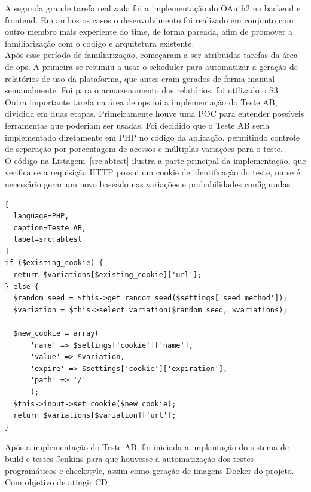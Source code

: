 A segunda grande tarefa realizada foi a implementação do \gls{OAuth2} no \gls{backend} e \gls{frontend}. Em ambos os casos o desenvolvimento foi realizado em conjunto com outro membro mais experiente do time, de forma pareada, afim de promover a familiarização com o código e arquitetura existente.\\

Após esse período de familiarização, começaram a ser atribuídas tarefas da área de \gls{ops}. A primeira se resumiu a usar o \gls{scheduler} para automatizar a geração de relatórios de uso da plataforma, que antes eram gerados de forma manual semanalmente. Foi para o armazenamento dos relatórios, foi utilizado o \gls{S3}.\\

Outra importante tarefa na área de \gls{ops} foi a implementação do \gls{Teste AB}, dividida em duas etapas. Primeiramente houve uma \gls{POC} para entender possíveis ferramentas que poderiam ser usadas. Foi decidido que o \gls{Teste AB} seria implementado diretamente em \gls{PHP} no código da aplicação, permitindo controle de separação por porcentagem de acessos e múltiplas variações para o teste.\\

O código na Listagem~\ref{src:abtest} ilustra a parte principal da implementação, que verifica se a requisição \gls{HTTP} possui um \gls{cookie} de identificação do teste, ou se é necessário gerar um novo baseado nas variações e probabilidades configuradas\\

\begin{lstlisting}[
  language=PHP,
  caption=Teste AB,
  label=src:abtest
]
if ($existing_cookie) {
  return $variations[$existing_cookie]['url'];
} else {
  $random_seed = $this->get_random_seed($settings['seed_method']);
  $variation = $this->select_variation($random_seed, $variations);

  $new_cookie = array(
      'name' => $settings['cookie']['name'],
      'value' => $variation,
      'expire' => $settings['cookie']['expiration'],
      'path' => '/'
      );
  $this->input->set_cookie($new_cookie);
  return $variations[$variation]['url'];
}
\end{lstlisting}

Após a implementação do \gls{Teste AB}, foi iniciada a implantação do sistema de build e testes \gls{Jenkins} para que houvesse a automatização dos testes programáticos e \gls{checkstyle}, assim como geração de imagens \gls{Docker} do projeto. Com objetivo de atingir \gls{CD}\\

